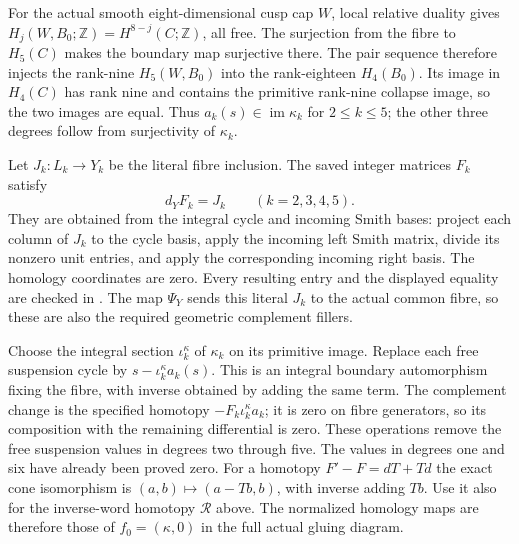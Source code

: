 For the actual smooth eight-dimensional cusp cap $W$, local relative
duality gives
$H_j(W,B_0;\mathbb Z)=H^{8-j}(C;\mathbb Z)$, all free.
The surjection from the fibre to $H_5(C)$ makes the boundary map
surjective there. The pair sequence therefore injects the rank-nine
$H_5(W,B_0)$ into the rank-eighteen $H_4(B_0)$.
Its image in $H_4(C)$ has rank nine and contains the primitive
rank-nine collapse image, so the two images are equal. Thus
$a_k(s)\in\operatorname{im}\kappa_k$ for $2\leq k\leq5$;
the other three degrees follow from surjectivity of $\kappa_k$.

Let $J_k:L_k\to Y_k$ be the literal fibre inclusion. The saved
integer matrices $F_k$ satisfy
\[
 d_YF_k=J_k\qquad(k=2,3,4,5).
\]
They are obtained from the integral cycle and incoming Smith bases:
project each column of $J_k$ to the cycle basis, apply the incoming
left Smith matrix, divide its nonzero unit entries, and apply the
corresponding incoming right basis. The homology coordinates are
zero. Every resulting entry and the displayed equality are checked
in .
The map $\Psi_Y$ sends this literal $J_k$ to the actual common
fibre, so these are also the required geometric complement fillers.

Choose the integral section $\iota_k^\kappa$ of $\kappa_k$ on
its primitive image. Replace each free suspension cycle by
$s-\iota_k^\kappa a_k(s)$. This is an integral boundary automorphism
fixing the fibre, with inverse obtained by adding the same term.
The complement change is the specified homotopy
$-F_k\iota_k^\kappa a_k$; it is zero on fibre generators, so
its composition with the remaining differential is zero.
These operations remove the free suspension values in degrees
two through five. The values in degrees one and six have already
been proved zero. For a homotopy $F'-F=dT+Td$ the exact cone
isomorphism is $(a,b)\mapsto(a-Tb,b)$, with inverse adding $Tb$.
Use it also for the inverse-word homotopy $\mathcal R$ above.
The normalized homology maps are therefore those of
$f_0=(\kappa,0)$ in the full actual gluing diagram.

